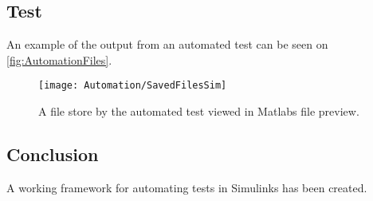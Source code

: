 \subsection{Test}
An example of the output from an automated test can be seen on \autoref{fig:AutomationFiles}.

\begin{figure} [H]
	\centering
	\texttt{[image: Automation/SavedFilesSim]}
	\caption{A file store by the automated test viewed in Matlabs file preview.}
	\label{fig:AutomationFiles}
\end{figure}


\subsection{Conclusion}
A working framework for automating tests in Simulinks has been created. 

